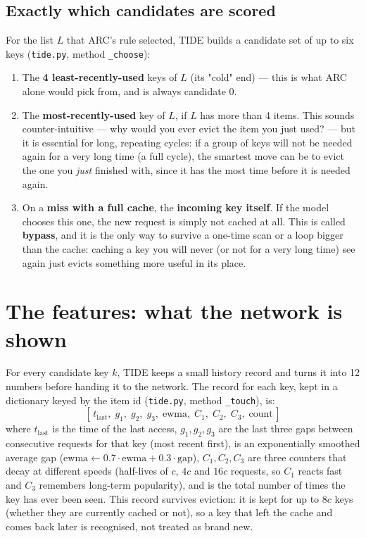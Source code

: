 \documentclass[10pt,a4paper]{article}
\newcommand{\code}[1]{\texttt{#1}}
\begin{document}
\subsection{Exactly which candidates are scored}
For the list $L$ that ARC's rule selected, TIDE builds a candidate set of up to six keys
(\code{tide.py}, method \code{\_choose}):
\begin{enumerate}
  \item The \textbf{4 least-recently-used} keys of $L$ (its "cold" end) --- this is what ARC alone would
        pick from, and is always candidate 0.
  \item The \textbf{most-recently-used} key of $L$, if $L$ has more than 4 items. This sounds
        counter-intuitive --- why would you ever evict the item you just used? --- but it is essential
        for long, repeating cycles: if a group of keys will not be needed again for a very long time
        (a full cycle), the smartest move can be to evict the one you \emph{just} finished with, since it
        has the most time before it is needed again.
  \item On a \textbf{miss with a full cache}, the \textbf{incoming key itself}. If the model chooses this
        one, the new request is simply not cached at all. This is called \textbf{bypass}, and it is the
        only way to survive a one-time scan or a loop bigger than the cache: caching a key you will never
        (or not for a very long time) see again just evicts something more useful in its place.
\end{enumerate}

\section{The features: what the network is shown}
For every candidate key $k$, TIDE keeps a small history record and turns it into 12 numbers before
handing it to the network. The record for each key, kept in a dictionary keyed by the item id
(\code{tide.py}, method \code{\_touch}), is:
\[
[\,t_{\text{last}},\; g_1,\; g_2,\; g_3,\; \text{ewma},\; C_1,\; C_2,\; C_3,\; \text{count}\,]
\]
where $t_{\text{last}}$ is the time of the last access, $g_1,g_2,g_3$ are the last three gaps between
consecutive requests for that key (most recent first),  is an exponentially smoothed average
gap ($\text{ewma} \leftarrow 0.7\cdot\text{ewma} + 0.3\cdot\text{gap}$), $C_1,C_2,C_3$ are three counters
that decay at different speeds (half-lives of $c$, $4c$ and $16c$ requests, so $C_1$ reacts fast and
$C_3$ remembers long-term popularity), and  is the total number of times the key has ever
been seen. This record survives eviction: it is kept for up to $8c$ keys (whether they are currently
cached or not), so a key that left the cache and comes back later is recognised, not treated as brand new.
\end{document}
